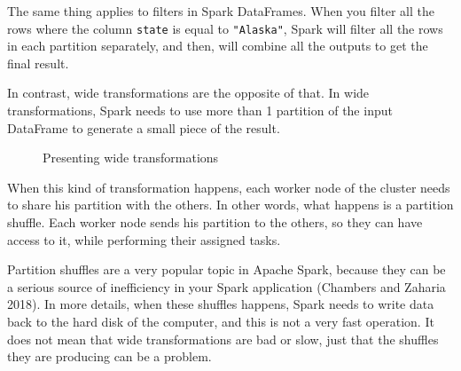 \documentclass[
  11pt,
  letterpaper,
  DIV=11,
  numbers=noendperiod]{scrreprt}
\begin{document}
The same thing applies to filters in Spark DataFrames. When you filter
all the rows where the column \texttt{state} is equal to
\texttt{"Alaska"}, Spark will filter all the rows in each partition
separately, and then, will combine all the outputs to get the final
result.

In contrast, wide transformations are the opposite of that. In wide
transformations, Spark needs to use more than 1 partition of the input
DataFrame to generate a small piece of the result.

\begin{figure}


\caption{\label{fig-wide-transformations}Presenting wide
transformations}

\end{figure}%

When this kind of transformation happens, each worker node of the
cluster needs to share his partition with the others. In other words,
what happens is a partition shuffle. Each worker node sends his
partition to the others, so they can have access to it, while performing
their assigned tasks.

Partition shuffles are a very popular topic in Apache Spark, because
they can be a serious source of inefficiency in your Spark application
(Chambers and Zaharia 2018). In more details, when these shuffles
happens, Spark needs to write data back to the hard disk of the
computer, and this is not a very fast operation. It does not mean that
wide transformations are bad or slow, just that the shuffles they are
producing can be a problem.
\end{document}
